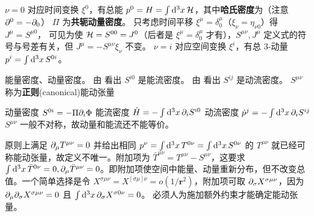 $\nu=0$ 对应时间变换 $\xi^0$，有总能 $p^0=H= \int\dd[3]{x} \mathcal{H}$，其中\textbf{哈氏密度}为（注意 $\partial^0=-\partial_0$）
$\Pi$ 为\textbf{共轭动量密度}。
只考虑时间平移 $\xi^\mu=\delta_0^\mu$（$\xi_\nu = \eta_{\nu 0}$）得 $J^\mu=S^{\mu 0}$，
可见为使 $\mathcal{H} = S^{00} = J^0$（后者是 $\xi^\mu=\delta_0^\mu$ 才有），$S^{\mu\nu},J^\mu$ 定义式的符号与号差有关，但 $J^\mu=-S^{\mu\nu}\xi_\nu$ 不变。
$\nu=i$ 对应空间变换 $\xi^i$，有总 3-动量 $p^i = \int\dd[3]{x}S^{0i}$。

能量密度、动量密度。
由  看出 $S^{i0}$ 是能流密度。
由  看出 $S^{ij}$ 是动流密度。
$S^{\mu\nu}$ 称为\textbf{正则}(canonical)能动张量

动量密度 $S^{0i}=-\Pi\partial_i\Phi$ 
能流密度 $\dot H=-\int\dd[3]{x} \partial_i S^{i0}$
动流密度 $\dot p^j = -\int\dd[3]{x} \partial_i S^{ij}$
$S^{\mu\nu}$ 一般不对称，故动量和能流还不能等价。

原则上满足 $\partial_\mu T^{\mu\nu}=0$ 并给出相同 $p^\nu=\int\dd[3]{x}T^{0\nu}=\int\dd[3]{x}S^{0\nu}$ 的 $T^{\mu\nu}$ 就已经可称能动张量，故定义不唯一。附加项为 $\bar T^{\mu\nu} = T^{\mu\nu} - S^{\mu\nu}$，这要求 $\int\dd[3]{x}\bar T^{0\nu} = 0,\partial_\mu \bar T^{\mu\nu} = 0$。即附加项使空间中能量、动量重新分布，但不改变总值。一个简单选择是令 $X^{\sigma\mu\nu}=X^{[\sigma\mu]\nu}=o(1/\bm r^2)$，附加项可取 $\partial_\sigma X^{\sigma\mu\nu}$，因为 $\partial_\mu\partial_\sigma X^{\sigma\mu\nu} = 0$ 且 $\int\dd[3]{x} \partial_\sigma X^{\sigma 0 \nu} = 0$。
必须人为施加额外约束才能确定能动张量。

